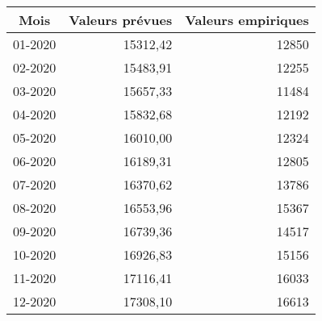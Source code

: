 \begin{tabular}{rrr}
\toprule
\multicolumn{1}{c}{Mois} & \multicolumn{1}{c}{Valeurs prévues} & \multicolumn{1}{c}{Valeurs empiriques} \\
\midrule
01-2020 & 15312,42 & 12850 \\
02-2020 & 15483,91 & 12255 \\
03-2020 & 15657,33 & 11484 \\
04-2020 & 15832,68 & 12192 \\
05-2020 & 16010,00 & 12324 \\
06-2020 & 16189,31 & 12805 \\
07-2020 & 16370,62 & 13786 \\
08-2020 & 16553,96 & 15367 \\
09-2020 & 16739,36 & 14517 \\
10-2020 & 16926,83 & 15156 \\
11-2020 & 17116,41 & 16033 \\
12-2020 & 17308,10 & 16613 \\
\bottomrule
\end{tabular}
